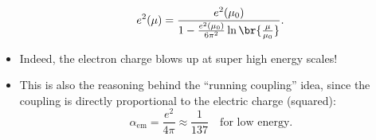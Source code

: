 \begin{itemize}
        \begin{equation}
            e^2(\mu) = \frac{e^2(\mu_0)}{1 - \frac{e^2(\mu_0)}{6\pi^2}\ln\br{\frac{\mu}{\mu_0}}}.
        \end{equation}
    \item Indeed, the electron charge blows up at super high energy scales!
    \item This is also the reasoning behind the ``running coupling'' idea, since the coupling is directly proportional to the electric charge (squared):
        \begin{equation}
            \alpha_{\mathrm{em}} = \frac{e^2}{4\pi} \approx \frac{1}{137} \quad \text{for low energy}.
        \end{equation}
\end{itemize}